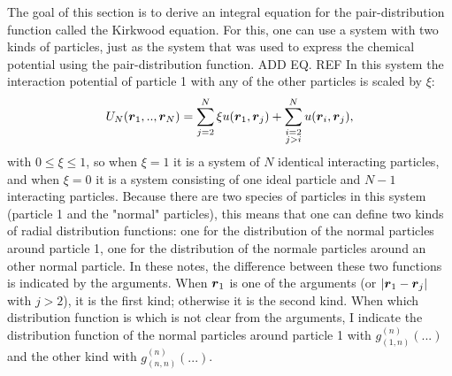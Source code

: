 
The goal of this section is to derive an integral equation for the pair-distribution function called the Kirkwood equation.
For this, one can use a system with two kinds of particles,
just as the system that was used to express the chemical potential using the pair-distribution function. ADD EQ. REF
In this system the interaction potential of particle 1 with any of the other particles is scaled by $\xi$:
\begin{align}\label{eq:kirkwood:UN_xi}
U_N(\boldsymbol{r}_1,..,\boldsymbol{r}_N) = \sum_{j=2}^{N} \xi u(\boldsymbol{r}_1,\boldsymbol{r}_j)
+ \sum_{\substack{i=2 \\ j>i}}^N u(\boldsymbol{r}_i,\boldsymbol{r}_j),
\end{align}
with $0 \leq \xi \leq 1$,
so when $\xi = 1$ it is a system of $N$ identical interacting particles,
and when $\xi = 0$ it is a system consisting of one ideal particle and $N-1$ interacting particles.
Because there are two species of particles in this system (particle 1 and the 
"normal" particles),
this means that one can define two kinds of radial distribution functions:
one for the distribution of the normal particles around particle 1,
one for the distribution of the normale particles around an other normal particle.
In these notes, the difference between these two functions is indicated by the arguments.
When $\boldsymbol{r}_1$ is one of the arguments (or $|\boldsymbol{r}_1 - \boldsymbol{r}_j|$ with $j>2$),
it is the first kind; otherwise it is the second kind.
When which distribution function is which is not clear from the arguments,
I indicate the distribution function of the normal particles around particle 1 with
$g^{(n)}_{(1,n)}(...)$ and the other kind with $g^{(n)}_{(n,n)}(...)$.

